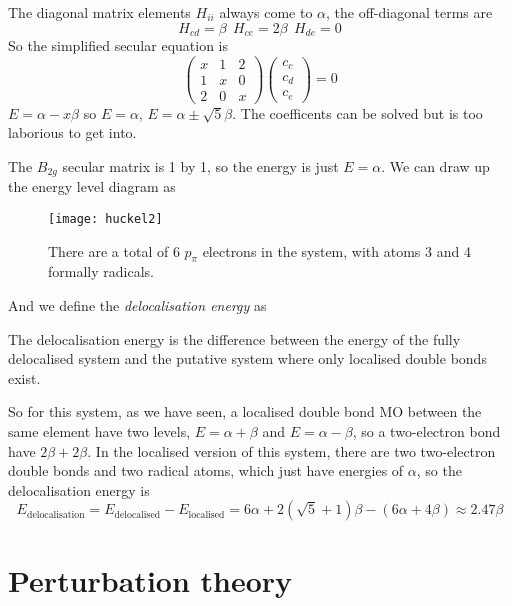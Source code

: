 The diagonal matrix elements $H_{ii}$ always come to $\alpha$, the off-diagonal terms are
\begin{equation}
	H_{cd}=\beta\ \ H_{ce}=2\beta\ \ H_{de}=0
\end{equation}
So the simplified secular equation is
\begin{equation}
		\begin{pmatrix}
		x & 1 &2\\
		1 & x &0\\
		2 & 0 & x
	\end{pmatrix}
	\begin{pmatrix}
		c_c\\
		c_d\\
		c_e
	\end{pmatrix}
	=0
\end{equation}
$E=\alpha-x\beta$ so $E=\alpha$, $E=\alpha\pm\sqrt{5}\beta$. The coefficents can be solved but is too laborious to get into.\par
The $B_{2g}$ secular matrix is 1 by 1, so the energy is just $E=\alpha$. We can draw up the energy level diagram as
\begin{figure}[H]
	\texttt{[image: huckel2]}
	\centering
	\caption{There are a total of 6 $p_{\pi}$ electrons in the system, with atoms 3 and 4 formally radicals.}
	\label{fig:huckel2}
\end{figure}
And we define the \emph{delocalisation energy} as
\begin{defi}
The delocalisation energy is the difference between the energy of the fully delocalised system and the putative system where only localised double bonds exist.
\end{defi}
So for this system, as we have seen, a localised double bond MO between the same element have two levels, $E=\alpha+\beta$ and $E=\alpha-\beta$, so a two-electron bond have $2\beta+2\beta$. In the localised version of this system, there are two two-electron double bonds and two radical atoms, which just have energies of $\alpha$, so the delocalisation energy is
\begin{equation}
	E_{\text{delocalisation}}=E_{\text{delocalised}}-E_{\text{localised}}=6\alpha+2(\sqrt{5}+1)\beta-(6\alpha+4\beta)\approx2.47\beta
\end{equation}
\section{Perturbation theory}
